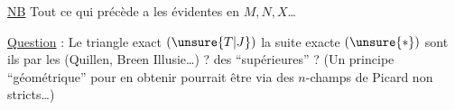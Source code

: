 \uline{NB} Tout ce qui précède a les  évidentes en $M,N,X$\ldots

\uline{Question} : Le triangle exact $(\unsure{T|J})$  la suite exacte $(\unsure{*})$ sont ils  par les  (Quillen, Breen Illusie\ldots) ?  des  ``supérieures'' ? (Un principe ``géométrique'' pour en obtenir pourrait être via des $n$-champs de Picard non  stricts\ldots)


